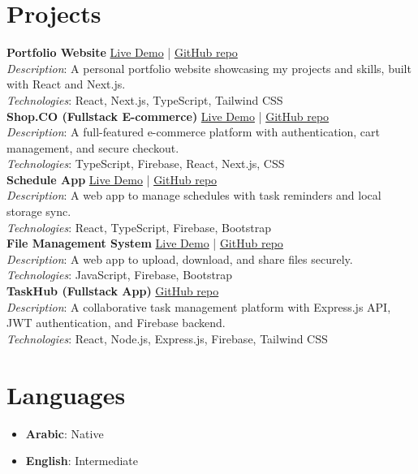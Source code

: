 \documentclass[a4paper,12pt]{article}
\begin{document}
\section*{Projects}
\textbf{Portfolio Website} \hfill 
\href{https://portfolio-ahmedraouanes-projects.vercel.app/}{Live Demo} | 
\href{https://github.com/ahmedRAOUANE/Portfolio}{GitHub repo}\\
\textit{Description}: A personal portfolio website showcasing my projects and skills, built with React and Next.js.\\
\textit{Technologies}: React, Next.js, TypeScript, Tailwind CSS\\[0.8em]

\textbf{Shop.CO (Fullstack E-commerce)} \hfill 
\href{https://shop-co-virid-two.vercel.app/}{Live Demo} | 
\href{https://github.com/ahmedRAOUANE/Shop.CO}{GitHub repo}\\
\textit{Description}: A full-featured e-commerce platform with authentication, cart management, and secure checkout.\\
\textit{Technologies}: TypeScript, Firebase, React, Next.js, CSS\\[0.8em]

\textbf{Schedule App} \hfill 
\href{https://schedule-app-blue.vercel.app/ar}{Live Demo} | 
\href{https://github.com/ahmedRAOUANE/schedule-app}{GitHub repo}\\
\textit{Description}: A web app to manage schedules with task reminders and local storage sync.\\
\textit{Technologies}: React, TypeScript, Firebase, Bootstrap\\[0.8em]

\textbf{File Management System} \hfill 
\href{https://ahmedraouane.github.io/file-management-system/}{Live Demo} | 
\href{https://github.com/ahmedRAOUANE/file-management-system}{GitHub repo}\\
\textit{Description}: A web app to upload, download, and share files securely.\\
\textit{Technologies}: JavaScript, Firebase, Bootstrap\\[0.8em]

\textbf{TaskHub (Fullstack App)} \hfill 
\href{https://github.com/ahmedRAOUANE/taskhub}{GitHub repo}\\
\textit{Description}: A collaborative task management platform with Express.js API, JWT authentication, and Firebase backend.\\
\textit{Technologies}: React, Node.js, Express.js, Firebase, Tailwind CSS

\section*{Languages}
\begin{itemize}[noitemsep]
    \item \textbf{Arabic}: Native
    \item \textbf{English}: Intermediate
\end{itemize}
\end{document}
